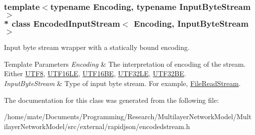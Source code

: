 \subsubsection*{template$<$typename Encoding, typename Input\+Byte\+Stream$>$\\*
class Encoded\+Input\+Stream$<$ Encoding, Input\+Byte\+Stream $>$}

Input byte stream wrapper with a statically bound encoding. 


\begin{DoxyTemplParams}{Template Parameters}
{\em Encoding} & The interpretation of encoding of the stream. Either \hyperlink{structUTF8}{U\+T\+F8}, \hyperlink{structUTF16LE}{U\+T\+F16\+LE}, \hyperlink{structUTF16BE}{U\+T\+F16\+BE}, \hyperlink{structUTF32LE}{U\+T\+F32\+LE}, \hyperlink{structUTF32BE}{U\+T\+F32\+BE}. \\
\hline
{\em Input\+Byte\+Stream} & Type of input byte stream. For example, \hyperlink{classFileReadStream}{File\+Read\+Stream}. \\
\hline
\end{DoxyTemplParams}


The documentation for this class was generated from the following file\+:\begin{DoxyCompactItemize}
\item 
/home/mate/\+Documents/\+Programming/\+Research/\+Multilayer\+Network\+Model/\+Multilayer\+Network\+Model/src/external/rapidjson/encodedstream.\+h\end{DoxyCompactItemize}
